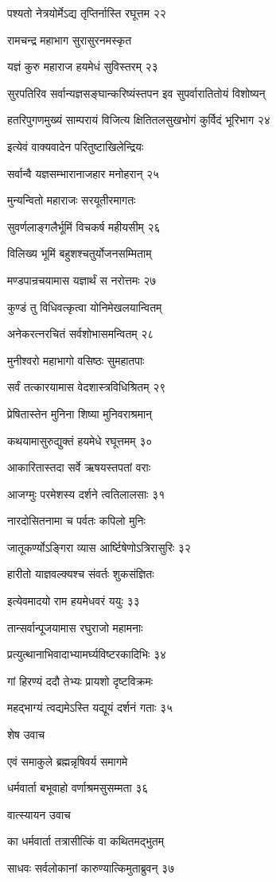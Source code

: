 पश्यतो नेत्रयोर्मेऽद्य तृप्तिर्नास्ति रघूत्तम २२

रामचन्द्र महाभाग सुरासुरनमस्कृत

यज्ञं कुरु महाराज हयमेधं सुविस्तरम् २३

सुरपतिरिव सर्वान्यज्ञसङ्घान्करिष्यंस्तपन इव सुपर्वारातितोयं विशोष्यन्

हतरिपुगणमुख्यं साम्परायं विजित्य क्षितितलसुखभोगं कुर्विदं भूरिभाग २४

इत्येवं वाक्यवादेन परितुष्टाखिलेन्द्रियः

सर्वान्वै यज्ञसम्भारानाजहार मनोहरान् २५

मुन्यन्वितो महाराजः सरयूतीरमागतः

सुवर्णलाङ्गलैर्भूमिं विचकर्ष महीयसीम् २६

विलिख्य भूमिं बहुशश्चतुर्योजनसम्मिताम्

मण्डपान्रचयामास यज्ञार्थं स नरोत्तमः २७

कुण्डं तु विधिवत्कृत्वा योनिमेखलयान्वितम्

अनेकरत्नरचितं सर्वशोभासमन्वितम् २८

मुनीश्वरो महाभागो वसिष्ठः सुमहातपाः

सर्वं तत्कारयामास वेदशास्त्रविधिश्रितम् २९

प्रेषितास्तेन मुनिना शिष्या मुनिवराश्रमान्

कथयामासुरुद्युक्तं हयमेधे रघूत्तमम् ३०

आकारितास्तदा सर्वे ऋषयस्तपतां वराः

आजग्मुः परमेशस्य दर्शने त्वतिलालसाः ३१

नारदोसितनामा च पर्वतः कपिलो मुनिः

जातूकर्ण्योऽङ्गिरा व्यास आर्ष्टिषेणोऽत्रिरासुरिः ३२

हारीतो याज्ञवल्क्यश्च संवर्तः शुकसंज्ञितः

इत्येवमादयो राम हयमेधवरं ययुः ३३

तान्सर्वान्पूजयामास रघुराजो महामनाः

प्रत्युत्थानाभिवादाभ्यामर्घ्यविष्टरकादिभिः ३४

गां हिरण्यं ददौ तेभ्यः प्रायशो दृष्टविक्रमः

महद्भाग्यं त्वद्यमेऽस्ति यद्यूयं दर्शनं गताः ३५

शेष उवाच

एवं समाकुले ब्रह्मन्नृषिवर्य समागमे

धर्मवार्ता बभूवाहो वर्णाश्रमसुसम्मता ३६

वात्स्यायन उवाच

का धर्मवार्ता तत्रासीत्किं वा कथितमद्भुतम्

साधवः सर्वलोकानां कारुण्यात्किमुताब्रुवन् ३७

